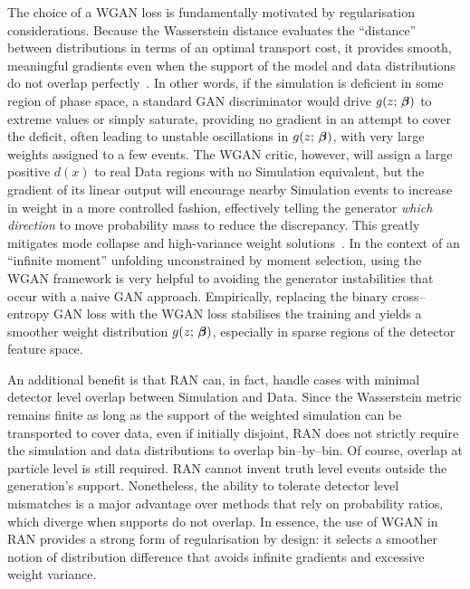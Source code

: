 {{            The choice of a WGAN loss is fundamentally motivated by regularisation considerations.
            Because the Wasserstein distance evaluates the ``distance'' between distributions in terms of an optimal transport cost, it provides smooth, meaningful gradients even when the support of the model and data distributions do not overlap perfectly~\cite{arjovsky_wasserstein_2017, arjovsky_towards_2017}.
            In other words, if the simulation is deficient in some region of phase space, a standard GAN discriminator would drive $g(z;\,\vb*\beta)$ to extreme values or simply saturate, providing no gradient in an attempt to cover the deficit, often leading to unstable oscillations in $g(z;\,\vb*\beta)$, with very large weights assigned to a few events.
            The WGAN critic, however, will assign a large positive $d(x)$ to real Data regions with no Simulation equivalent, but the gradient of its linear output will encourage nearby Simulation events to increase in weight in a more controlled fashion, effectively telling the generator \emph{which direction} to move probability mass to reduce the discrepancy.
            This greatly mitigates mode collapse and high-variance weight solutions~\cite{rosca_case_2021, doan_image_2020}.
            In the context of an ``infinite moment'' unfolding unconstrained by moment selection, using the WGAN framework is very helpful to avoiding the generator instabilities that occur with a naive GAN approach.
            Empirically, replacing the binary cross--entropy GAN loss with the WGAN loss stabilises the training and yields a smoother weight distribution $g(z;\,\vb*\beta)$, especially in sparse regions of the detector feature space.
            
            An additional benefit is that RAN can, in fact, handle cases with {minimal detector level overlap} between Simulation and Data.
            Since the Wasserstein metric remains finite as long as the support of the weighted simulation can be transported to cover data, even if initially disjoint, RAN does not strictly require the simulation and data distributions to overlap bin--by--bin.
            Of course, overlap at particle level is still required.
            RAN cannot invent truth level events outside the generation’s support.
            Nonetheless, the ability to tolerate detector level mismatches is a major advantage over methods that rely on probability ratios, which diverge when supports do not overlap.
            In essence, the use of WGAN in RAN provides a strong form of regularisation by design: it selects a smoother notion of distribution difference that avoids infinite gradients and excessive weight variance.
}}
